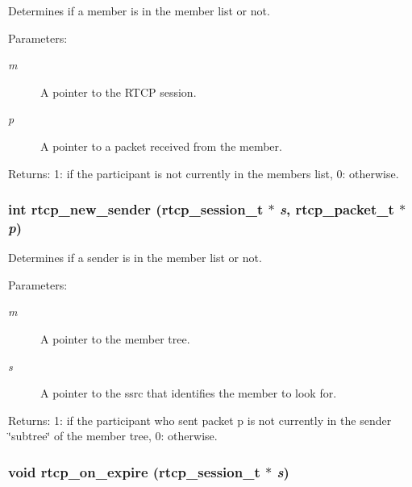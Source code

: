 Determines if a member is in the member list or not. \begin{Desc}
\item[Parameters:]
\begin{description}
\item[{\em m}]A pointer to the RTCP session. \item[{\em p}]A pointer to a packet received from the member. \end{description}
\end{Desc}
\begin{Desc}
\item[Returns:]1: if the participant is not currently in the members list, 0: otherwise. \end{Desc}
\subsubsection{\setlength{\rightskip}{0pt plus 5cm}int rtcp\_\-new\_\-sender ({\bf rtcp\_\-session\_\-t} $\ast$ {\em s}, {\bf rtcp\_\-packet\_\-t} $\ast$ {\em p})\hspace{0.3cm}{\tt  [static]}}\label{rtcp_8h_a5}


Determines if a sender is in the member list or not. \begin{Desc}
\item[Parameters:]
\begin{description}
\item[{\em m}]A pointer to the member tree. \item[{\em s}]A pointer to the ssrc that identifies the member to look for. \end{description}
\end{Desc}
\begin{Desc}
\item[Returns:]1: if the participant who sent packet p is not currently in the sender \char`\"{}subtree\char`\"{} of the member tree, 0: otherwise. \end{Desc}
\subsubsection{\setlength{\rightskip}{0pt plus 5cm}void rtcp\_\-on\_\-expire ({\bf rtcp\_\-session\_\-t} $\ast$ {\em s})}\label{rtcp_8h_a14}


